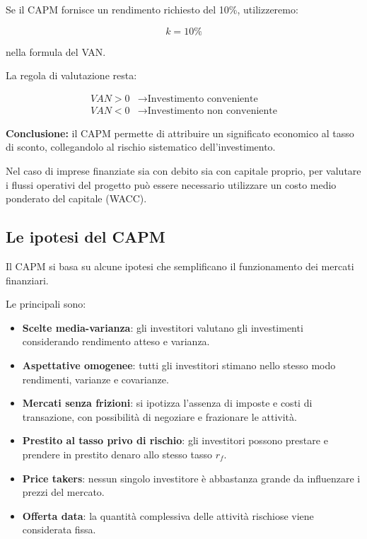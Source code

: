 \medskip

\noindent Se il CAPM fornisce un rendimento
richiesto del 10\%, utilizzeremo:

\[
k=10\%
\]

\noindent nella formula del VAN.

\medskip

\noindent La regola di valutazione resta:

\[
\boxed{
\begin{aligned}
VAN>0&\rightarrow\text{Investimento conveniente}\\
VAN<0&\rightarrow\text{Investimento non conveniente}
\end{aligned}
}
\]

\noindent \textbf{Conclusione:} il CAPM permette
di attribuire un significato economico
al tasso di sconto, collegandolo
al rischio sistematico dell'investimento.

\medskip

\noindent Nel caso di imprese finanziate
sia con debito sia con capitale proprio,
per valutare i flussi operativi del progetto
può essere necessario utilizzare
un costo medio ponderato del capitale (WACC).


\subsection{Le ipotesi del CAPM}

\noindent Il CAPM si basa su alcune ipotesi
che semplificano il funzionamento
dei mercati finanziari.

\medskip

\noindent Le principali sono:

\begin{itemize}
    \item \textbf{Scelte media-varianza}:
    gli investitori valutano gli investimenti
    considerando rendimento atteso e varianza.

    \item \textbf{Aspettative omogenee}:
    tutti gli investitori stimano nello stesso
    modo rendimenti, varianze e covarianze.

    \item \textbf{Mercati senza frizioni}:
    si ipotizza l'assenza di imposte
    e costi di transazione, con possibilità
    di negoziare e frazionare le attività.

    \item \textbf{Prestito al tasso privo di rischio}:
    gli investitori possono prestare
    e prendere in prestito denaro allo
    stesso tasso $r_f$.

    \item \textbf{Price takers}:
    nessun singolo investitore è abbastanza
    grande da influenzare i prezzi del mercato.

    \item \textbf{Offerta data}:
    la quantità complessiva delle attività
    rischiose viene considerata fissa.
\end{itemize}


